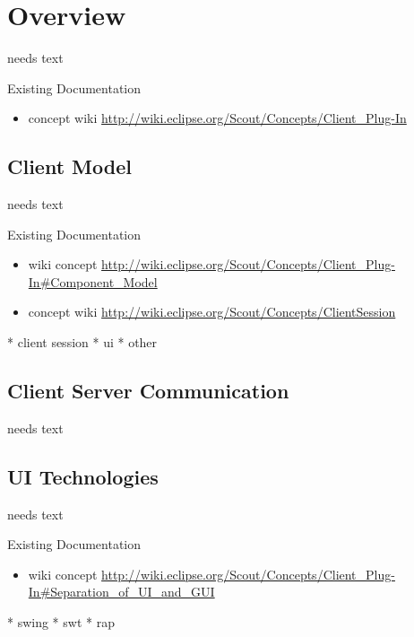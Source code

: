 \documentclass[a4paper,10pt,twoside]{book}
\begin{document}
  \sloppy
\fi


\chapter{Overview}

needs text
  
\noindent Existing Documentation
\begin{itemize}
  \item concept wiki \url{http://wiki.eclipse.org/Scout/Concepts/Client_Plug-In}
\end{itemize}

\section{Client Model}
needs text

\noindent Existing Documentation
\begin{itemize}
  \item wiki concept \url{http://wiki.eclipse.org/Scout/Concepts/Client_Plug-In#Component_Model}
  \item concept wiki \url{http://wiki.eclipse.org/Scout/Concepts/ClientSession}
\end{itemize}

  * client session
  * ui
  * other
  
\section{Client Server Communication}
needs text

\section{UI Technologies}
needs text

\noindent Existing Documentation
\begin{itemize}
  \item wiki concept \url{http://wiki.eclipse.org/Scout/Concepts/Client_Plug-In#Separation_of_UI_and_GUI}
\end{itemize}
  
  * swing
  * swt
  * rap
\end{document}
